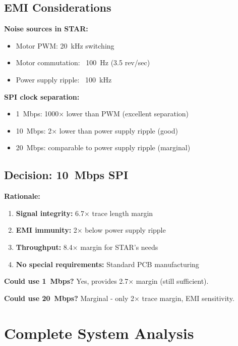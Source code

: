 \subsection{EMI Considerations}

\textbf{Noise sources in STAR:}
\begin{itemize}
    \item Motor PWM: 20~kHz switching
    \item Motor commutation: ~100~Hz (3.5 rev/sec)
    \item Power supply ripple: ~100~kHz
\end{itemize}

\textbf{SPI clock separation:}
\begin{itemize}
    \item 1~Mbps: 1000× lower than PWM (excellent separation)
    \item 10~Mbps: 2× lower than power supply ripple (good)
    \item 20~Mbps: comparable to power supply ripple (marginal)
\end{itemize}

\subsection{Decision: 10~Mbps SPI}

\textbf{Rationale:}
\begin{enumerate}
    \item \textbf{Signal integrity:} 6.7× trace length margin
    \item \textbf{EMI immunity:} 2× below power supply ripple
    \item \textbf{Throughput:} 8.4× margin for STAR's needs
    \item \textbf{No special requirements:} Standard PCB manufacturing
\end{enumerate}

\textbf{Could use 1~Mbps?} Yes, provides 2.7× margin (still sufficient).

\textbf{Could use 20~Mbps?} Marginal - only 2× trace margin, EMI sensitivity.

\section{Complete System Analysis}

